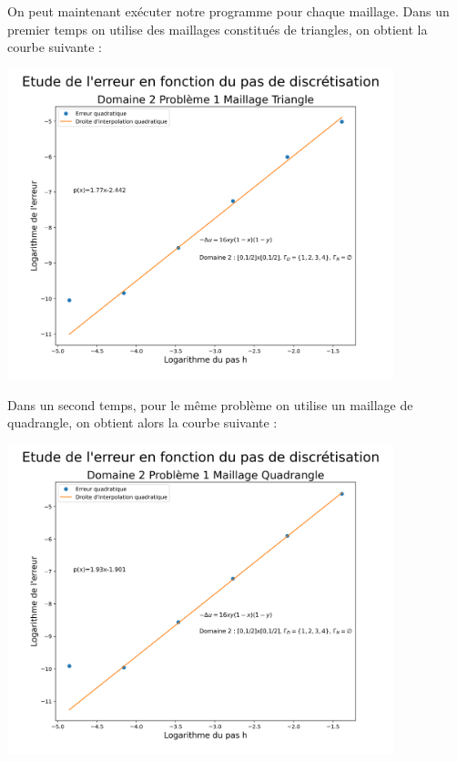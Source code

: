 \documentclass[a4paper, 12pt, french]{report}
\begin{document}
On peut maintenant exécuter notre programme pour chaque maillage.
Dans un premier temps on utilise des maillages constitués de triangles, on obtient la courbe suivante :

\begin{center}
    \includegraphics[height=9cm]{../Images/Courbes_Erreurs/D2P1T.png}
\end{center}

Dans un second temps, pour le même problème on utilise un maillage de quadrangle, on obtient alors la courbe suivante :
\begin{center}
    \includegraphics[height=9cm]{../Images/Courbes_Erreurs/D2P1Q.png}
\end{center}
\end{document}
